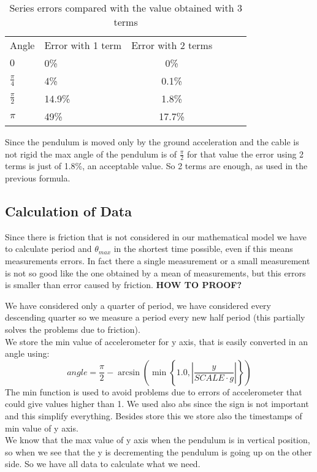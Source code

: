 \begin{table}[H]
	\small
	\begin{center}
		
		\caption{Series errors compared with the value obtained with 3 terms}
		\begin{tabular}{l|lcc|L{2cm}l}
			Angle & Error with 1 term & Error with 2 terms\\
			$0$ & 0\% & 0\%\\			
			$\frac{\pi}{4}$ & 4\% & 0.1\%\\			
			$\frac{\pi}{2}$ & 14.9\% & 1.8\%\\			
			$\pi$ & 49\% & 17.7\%\\			
		\end{tabular}
		\label{tab:errors}
	\end{center}
\end{table}

Since the pendulum is moved only by the ground acceleration and the cable is not rigid the max angle of the pendulum is of $\frac{\pi}{2}$ for that value the error using 2 terms is just of 1.8\%, an acceptable value. So 2 terms are enough, as used in the previous formula.

\subsection{Calculation of Data}
\label{sec:datacalc}

Since there is friction that is not considered in our mathematical model we have to calculate period and $\theta_{max}$ in the shortest time possible, even if this means measurements errors. In fact there a single measurement or a small measurement is not so good like the one obtained by a mean of measurements, but this errors is smaller than error caused by friction. \textbf{HOW TO PROOF?}\par

We have considered only a quarter of period, we have considered every descending quarter so we measure a period every new half period (this partially solves the problems due to friction).\\
We store the min value of accelerometer for y axis, that is easily converted in an angle using:
$$angle = \frac{\pi}{2} -\arcsin\left(\min\left\lbrace1.0, \left|\frac{y}{SCALE \cdot g}\right|\right\rbrace\right)$$
The min function is used to avoid problems due to errors of accelerometer that could give values higher than 1. We used also abs since the sign is not important and this simplify everything.
Besides store this we store also the timestamps of min value of y axis.\\
We know that the max value of y axis when the pendulum is in vertical position, so when we see that the y is decrementing the pendulum is going up on the other side. So we have all data to calculate what we need.\par

